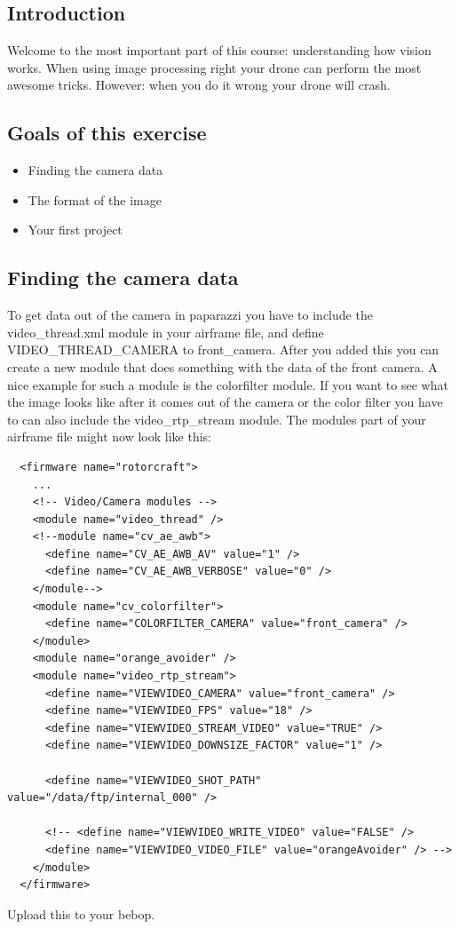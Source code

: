 \documentclass{article}
\begin{document}

\subsection*{Introduction}
Welcome to the most important part of this course: understanding how vision works. When using image processing right your drone can perform the most awesome tricks. However: when you do it wrong your drone will crash. 

\subsection*{Goals of this exercise}
\begin{itemize}
\item Finding the camera data
\item The format of the image
\item Your first project
\end{itemize}

\subsection*{Finding the camera data}
To get data out of the camera in paparazzi you have to include the video\_thread.xml module in your airframe file, and define VIDEO\_THREAD\_CAMERA to front\_camera. After you added this you can create a new module that does something with the data of the front camera. A nice example for such a module is the colorfilter module.
If you want to see what the image looks like after it comes out of the camera or the color filter you have to can also include the video\_rtp\_stream  module. 
The modules part of your airframe file might now look like this:
\begin{verbatim}
  <firmware name="rotorcraft">
    ...
    <!-- Video/Camera modules -->
    <module name="video_thread" />
    <!--module name="cv_ae_awb">
      <define name="CV_AE_AWB_AV" value="1" />
      <define name="CV_AE_AWB_VERBOSE" value="0" />
    </module-->
    <module name="cv_colorfilter">
      <define name="COLORFILTER_CAMERA" value="front_camera" />
    </module>
    <module name="orange_avoider" />
    <module name="video_rtp_stream">
      <define name="VIEWVIDEO_CAMERA" value="front_camera" />
      <define name="VIEWVIDEO_FPS" value="18" />
      <define name="VIEWVIDEO_STREAM_VIDEO" value="TRUE" />
      <define name="VIEWVIDEO_DOWNSIZE_FACTOR" value="1" />
      
      <define name="VIEWVIDEO_SHOT_PATH" value="/data/ftp/internal_000" />
      
      <!-- <define name="VIEWVIDEO_WRITE_VIDEO" value="FALSE" />
      <define name="VIEWVIDEO_VIDEO_FILE" value="orangeAvoider" /> -->
    </module>
  </firmware>
\end{verbatim}
Upload this to your bebop.
\end{document}
